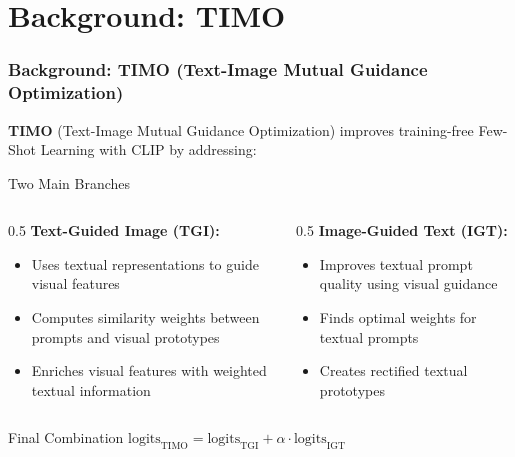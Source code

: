 \documentclass{beamer}
\begin{document}
\section{Background: TIMO}
\begin{frame}
  \frametitle{Background: TIMO (Text-Image Mutual Guidance Optimization)}
  \textbf{TIMO} (Text-Image Mutual Guidance Optimization) improves training-free Few-Shot Learning with CLIP by addressing:  
  \begin{block}{Two Main Branches}
    \begin{columns}[T]
    \begin{column}{0.5\textwidth}
      \textbf{Text-Guided Image (TGI):}
      \begin{itemize}
        \item Uses textual representations to guide visual features
        \item Computes similarity weights between prompts and visual prototypes
        \item Enriches visual features with weighted textual information
      \end{itemize}
    \end{column}
    \begin{column}{0.5\textwidth}
      \textbf{Image-Guided Text (IGT):}
      \begin{itemize}
        \item Improves textual prompt quality using visual guidance
        \item Finds optimal weights for textual prompts
        \item Creates rectified textual prototypes
      \end{itemize}
    \end{column}
    \end{columns}
  \end{block}
  
  \begin{block}{Final Combination}
    $\text{logits}_{\text{TIMO}} = \text{logits}_{\text{TGI}} + \alpha \cdot \text{logits}_{\text{IGT}}$
  \end{block}
\end{frame}


\end{document}
